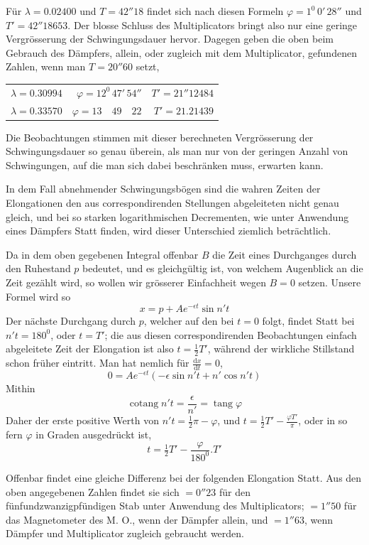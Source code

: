 Für $\lambda=0.02400$ und $T=42''18$ findet sich nach diesen Formeln $\varphi=1^0\,0'\,28''$ und $T'=42''18653$. Der blosse Schluss des Multiplicators bringt also nur eine geringe Vergrösserung der Schwingungsdauer hervor. Dagegen geben die oben beim Gebrauch des Dämpfers, allein, oder zugleich mit dem Multiplicator, gefundenen Zahlen, wenn man $T=20''60$ setzt,
\begin{center}
\begin{tabular}{r|r|r}
$\lambda=0.30994$&$\varphi=12^0\,47'\,54''$&$T'=21''12484$\\
$\lambda=0.33570$&$\varphi=13\quad49\quad22$&$T'=21.21439$
\end{tabular}
\end{center}

Die Beobachtungen stimmen mit dieser berechneten Vergrösserung der Schwingungsdauer so genau überein, als man nur von der geringen Anzahl von Schwingungen, auf die man sich dabei beschränken muss, erwarten kann.

In dem Fall abnehmender Schwingungsbögen sind die wahren Zeiten der Elongationen den aus correspondirenden Stellungen abgeleiteten nicht genau gleich, und bei so starken logarithmischen Decrementen, wie unter Anwendung eines Dämpfers Statt finden, wird dieser Unterschied ziemlich beträchtlich.

Da in dem oben gegebenen Integral offenbar $B$ die Zeit eines Durchganges durch den Ruhestand $p$ bedeutet, und es gleichgültig ist, von welchem Augenblick an die Zeit gezählt wird, so wollen wir grösserer Einfachheit wegen $B=0$ setzen. Unsere Formel wird so
\[
x=p+Ae^{-\epsilon t}\sin n't
\]
Der nächste Durchgang durch $p$, welcher auf den bei $t=0$ folgt, findet Statt bei $n't=180^0$, oder $t=T'$; die aus diesen correspondirenden Beobachtungen einfach abgeleitete Zeit der Elongation ist also $t=\tfrac12T'$, während der wirkliche Stillstand schon früher eintritt. Man hat nemlich für $\frac{\mathrm{d}x}{\mathrm{d}t}=0$,
\[
0=Ae^{-\epsilon t}(-\epsilon\sin n't+n'\cos n't)
\]
Mithin
\[
\operatorname{cotang}n't=\frac{\epsilon}{n'}=\operatorname{tang}\varphi
\]
Daher der erste positive Werth von $n't=\tfrac12\pi-\varphi$, und $t=\tfrac12T'-\frac{\varphi T'}{\pi}$, oder in so fern $\varphi$ in Graden ausgedrückt ist,
\[
t=\tfrac12T'-\frac{\varphi}{180^0}.T'
\]

Offenbar findet eine gleiche Differenz bei der folgenden Elongation Statt. Aus den oben angegebenen Zahlen findet sie sich $=0''23$ für den fünfundzwanzigpfündigen Stab unter Anwendung des Multiplicators; $=1''50$ für das Magnetometer des M. O., wenn der Dämpfer allein, und $=1''63$, wenn Dämpfer und Multiplicator zugleich gebraucht werden.

